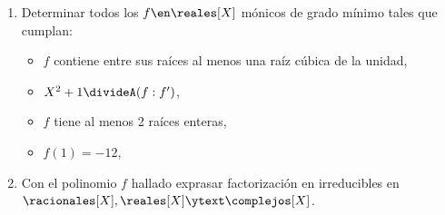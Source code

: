 \begin{enunciado}{\ejExtra}
  \begin{enumerate}[label=\alph*)]
    \item
          Determinar todos los $f \en \reales[X]$ mónicos de grado mínimo tales que cumplan:
          \begin{itemize}
            \item $f$ contiene entre sus raíces al menos una raíz cúbica de la unidad,
            \item $X^2 + 1 \divideA (f:f')$,
            \item $f$ tiene al menos 2 raíces enteras,
            \item $f(1) = -12$,
          \end{itemize}

    \item Con el polinomio $f$ hallado exprasar factorización en irreducibles en $\racionales[X], \reales[X] \ytext \complejos[X]$.
  \end{enumerate}
\end{enunciado}

\hacer
